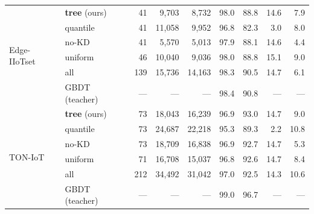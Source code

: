\begin{table}[!ht]
{\begin{tabular}{l l r r r r r r r}
\midrule
\multirow{6}{*}{Edge-IIoTset}
& \textbf{tree} (ours) & 41 & 9,703 & 8,732 & 98.0 & 88.8 & 14.6 & 7.9 \\
& quantile & 41 & 11,058 & 9,952 & 96.8 & 82.3 & 3.0 & 8.0 \\
& no-KD & 41 & 5,570 & 5,013 & 97.9 & 88.1 & 14.6 & 4.4 \\
& uniform & 46 & 10,040 & 9,036 & 98.0 & 88.8 & 15.1 & 9.0 \\
& all & 139 & 15,736 & 14,163 & 98.3 & 90.5 & 14.7 & 6.1 \\
& GBDT (teacher) & --- & --- & --- & 98.4 & 90.8 & --- & --- \\
\midrule
\multirow{6}{*}{TON-IoT}
& \textbf{tree} (ours) & 73 & 18,043 & 16,239 & 96.9 & 93.0 & 14.7 & 9.0 \\
& quantile & 73 & 24,687 & 22,218 & 95.3 & 89.3 & 2.2 & 10.8 \\
& no-KD & 73 & 18,709 & 16,838 & 96.9 & 92.7 & 14.7 & 5.3 \\
& uniform & 71 & 16,708 & 15,037 & 96.8 & 92.6 & 14.7 & 8.4 \\
& all & 212 & 34,492 & 31,042 & 97.0 & 92.5 & 14.3 & 10.6 \\
& GBDT (teacher) & --- & --- & --- & 99.0 & 96.7 & --- & --- \\
\bottomrule
\end{tabular}}
\end{table}
